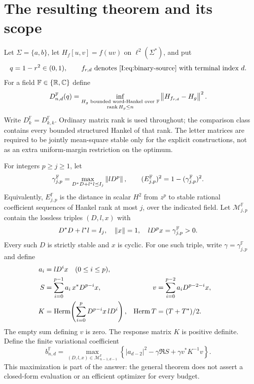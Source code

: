 \section{The resulting theorem and its scope}
Let $\Sigma=\{a,b\}$, let $H_f[u,v]=f(uv)$ on $\ell^2(\Sigma^*)$, and put
\[
 q=1-r^2\in(0,1),\qquad
 f_{r,d}\text{ denotes \eqref{I:eq:binary-source} with terminal index }d.
\]
For a field $\mathbb F\in\{\mathbb R,\mathbb C\}$ define
\[
 D_{n,d}^{\mathbb F}(q)=
 \inf_{\substack{H_g\text{ bounded word-Hankel over }\mathbb F\\
                 \operatorname{rank} H_g\le n}}
       \left\lVert H_{f_{r,d}}-H_g\right\rVert^{2}.
\]
Write $D_k^{\mathbb F}=D_{k,k}^{\mathbb F}$. Ordinary matrix rank is
used throughout; the comparison class contains every bounded structured
Hankel of that rank. The letter matrices are required to be jointly
mean-square stable only for the explicit constructions, not as an
extra uniform-margin restriction on the optimum.

For integers $p\ge j\ge1$, let
\[
 \gamma_{j,p}^{\mathbb F}
 =\max_{D^*D+l^*l\preceq I_j}\left\lVert lD^p\right\rVert,\qquad
 (E_{j,p}^{\mathbb F})^2=1-(\gamma_{j,p}^{\mathbb F})^2.
\]
Equivalently, $E_{j,p}^{\mathbb F}$ is the distance in scalar $H^2$
from $z^p$ to stable rational coefficient sequences of Hankel rank at
most $j$, over the indicated field. Let $\mathcal M_{j,p}^{\mathbb F}$
contain the lossless triples $(D,l,x)$ with
\[
 D^*D+l^*l=I_j,\quad \left\lVert x\right\rVert=1,\quad
 lD^p x=\gamma_{j,p}^{\mathbb F}>0.
\]
Every such $D$ is strictly stable and $x$ is cyclic. For one such triple,
write $\gamma=\gamma_{j,p}^{\mathbb F}$ and define
\begin{align*}
 a_i&=lD^i x\quad(0\le i\le p),\\
 S&=\sum_{i=0}^{p-1}a_i\,x^*D^{p-i}x,
 &v&=\sum_{i=0}^{p-2}a_iD^{p-2-i}x,\\
 K&=\operatorname{Herm}\!\left(\sum_{i=0}^{p}D^{p-i}x\,lD^i\right),
 &\operatorname{Herm} T&=(T+T^*)/2.
\end{align*}
The empty sum defining $v$ is zero. The response matrix $K$ is positive
definite. Define the finite variational coefficient
\begin{equation}
 b_{n,d}^{\mathbb F}=
 \max_{(D,l,x)\in\mathcal M_{n-1,d-1}^{\mathbb F}}
 \left\{|a_{d-2}|^2-\gamma\Re S+
                     \gamma v^*K^{-1}v\right\}.
 \label{I:R:eq:main-response-coefficient}
\end{equation}
This maximization is part of the answer: the general theorem does not
assert a closed-form evaluation or an efficient optimizer for every
budget.

